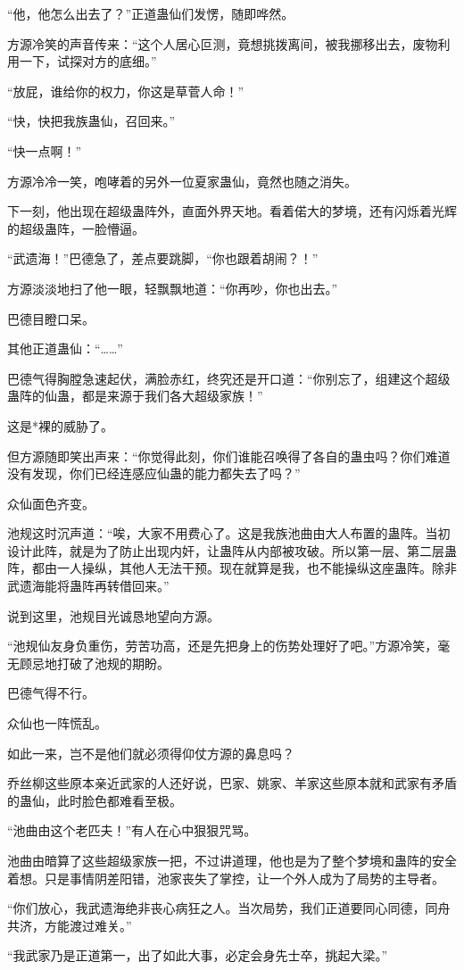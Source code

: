 \begin{this_body}
“他，他怎么出去了？”正道蛊仙们发愣，随即哗然。

方源冷笑的声音传来：“这个人居心叵测，竟想挑拨离间，被我挪移出去，废物利用一下，试探对方的底细。”

“放屁，谁给你的权力，你这是草菅人命！”

“快，快把我族蛊仙，召回来。”

“快一点啊！”

方源冷冷一笑，咆哮着的另外一位夏家蛊仙，竟然也随之消失。

下一刻，他出现在超级蛊阵外，直面外界天地。看着偌大的梦境，还有闪烁着光辉的超级蛊阵，一脸懵逼。

“武遗海！”巴德急了，差点要跳脚，“你也跟着胡闹？！”

方源淡淡地扫了他一眼，轻飘飘地道：“你再吵，你也出去。”

巴德目瞪口呆。

其他正道蛊仙：“……”

巴德气得胸膛急速起伏，满脸赤红，终究还是开口道：“你别忘了，组建这个超级蛊阵的仙蛊，都是来源于我们各大超级家族！”

这是*裸的威胁了。

但方源随即笑出声来：“你觉得此刻，你们谁能召唤得了各自的蛊虫吗？你们难道没有发现，你们已经连感应仙蛊的能力都失去了吗？”

众仙面色齐变。

池规这时沉声道：“唉，大家不用费心了。这是我族池曲由大人布置的蛊阵。当初设计此阵，就是为了防止出现内奸，让蛊阵从内部被攻破。所以第一层、第二层蛊阵，都由一人操纵，其他人无法干预。现在就算是我，也不能操纵这座蛊阵。除非武遗海能将蛊阵再转借回来。”

说到这里，池规目光诚恳地望向方源。

“池规仙友身负重伤，劳苦功高，还是先把身上的伤势处理好了吧。”方源冷笑，毫无顾忌地打破了池规的期盼。

巴德气得不行。

众仙也一阵慌乱。

如此一来，岂不是他们就必须得仰仗方源的鼻息吗？

乔丝柳这些原本亲近武家的人还好说，巴家、姚家、羊家这些原本就和武家有矛盾的蛊仙，此时脸色都难看至极。

“池曲由这个老匹夫！”有人在心中狠狠咒骂。

池曲由暗算了这些超级家族一把，不过讲道理，他也是为了整个梦境和蛊阵的安全着想。只是事情阴差阳错，池家丧失了掌控，让一个外人成为了局势的主导者。

“你们放心，我武遗海绝非丧心病狂之人。当次局势，我们正道要同心同德，同舟共济，方能渡过难关。”

“我武家乃是正道第一，出了如此大事，必定会身先士卒，挑起大梁。”

\end{this_body}

